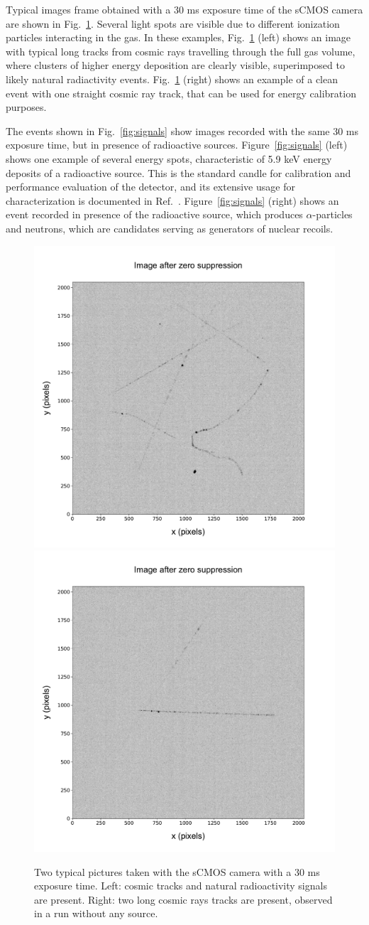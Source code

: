 \documentclass[12pt]{iopart}
\begin{document}
Typical images frame obtained with a 30 ms exposure time of the sCMOS
camera are shown in Fig.~\ref{fig:typicalimage1}. Several light spots
are visible due to different ionization particles interacting in the
gas.  In these examples, Fig.~\ref{fig:typicalimage1} (left) shows an
image with typical long tracks from cosmic rays travelling through the
full gas volume, where clusters of higher energy deposition are
clearly visible, superimposed to likely natural radiactivity events.
Fig.~\ref{fig:typicalimage1} (right) shows an example of a clean event
with one straight cosmic ray track, that can be used for energy
calibration purposes.

The events shown in Fig.~\ref{fig:signals} show images recorded with
the same 30 ms exposure time, but in presence of radioactive
sources. Figure~\ref{fig:signals} (left) shows one example of several
energy spots, characteristic of 5.9 keV energy deposits of a \fe
radioactive source.  This is the standard candle for calibration and
performance evaluation of the detector, and its extensive usage for
\lemon characterization is documented in
Ref.~\cite{bib:fe55}. Figure~\ref{fig:signals} (right) shows an event
recorded in presence of the \ambe radioactive source, which produces
$\alpha$-particles and neutrons, which are candidates serving as
generators of nuclear recoils.
 
\begin{figure}[ht]
  \begin{center}
    \includegraphics[width=0.49\linewidth]{figures/pic_run02317_ev8_oriIma_paper}
    \includegraphics[width=0.49\linewidth]{figures/pic_run02156_ev527_oriIma_paper}
    \caption{Two typical pictures taken with the sCMOS camera with a 30
      ms exposure time. Left: cosmic tracks and natural radioactivity
      signals are present. Right: two long cosmic rays tracks are
      present, observed in a run without any source.
      \label{fig:typicalimage1}}
  \end{center}
\end{figure}
\end{document}
